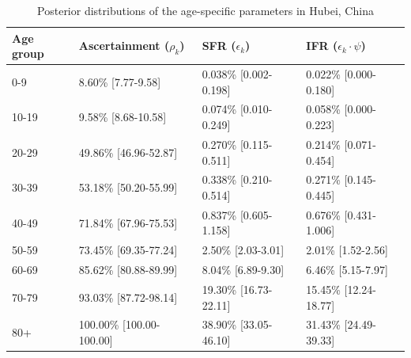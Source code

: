 \documentclass{article}
\begin{document}
\begin{table}[H]
	\centering
	\begin{tabular}{llll}
		\hline
		Age group & Ascertainment ($\rho_k$) & SFR ($\epsilon_k$) & IFR ($\epsilon_k\cdot\psi$) \\ 
		\hline
		0-9 & 8.60\% [7.77-9.58] & 0.038\% [0.002-0.198] & 0.022\% [0.000-0.180] \\ 
		10-19 & 9.58\% [8.68-10.58] & 0.074\% [0.010-0.249] & 0.058\% [0.000-0.223] \\ 
		20-29 & 49.86\% [46.96-52.87] & 0.270\% [0.115-0.511] & 0.214\% [0.071-0.454] \\ 
		30-39 & 53.18\% [50.20-55.99] & 0.338\% [0.210-0.514] & 0.271\% [0.145-0.445] \\ 
		40-49 & 71.84\% [67.96-75.53] & 0.837\% [0.605-1.158] & 0.676\% [0.431-1.006] \\ 
		50-59 & 73.45\% [69.35-77.24] & 2.50\% [2.03-3.01] & 2.01\% [1.52-2.56] \\ 
		60-69 & 85.62\% [80.88-89.99] & 8.04\% [6.89-9.30] & 6.46\% [5.15-7.97] \\ 
		70-79 & 93.03\% [87.72-98.14] & 19.30\% [16.73-22.11] & 15.45\% [12.24-18.77] \\ 
		80+ & 100.00\% [100.00-100.00] & 38.90\% [33.05-46.10] & 31.43\% [24.49-39.33] \\ 
		\hline
	\end{tabular}
	\caption{Posterior distributions of the age-specific parameters in Hubei, China} 
\end{table}
\clearpage
\end{document}
